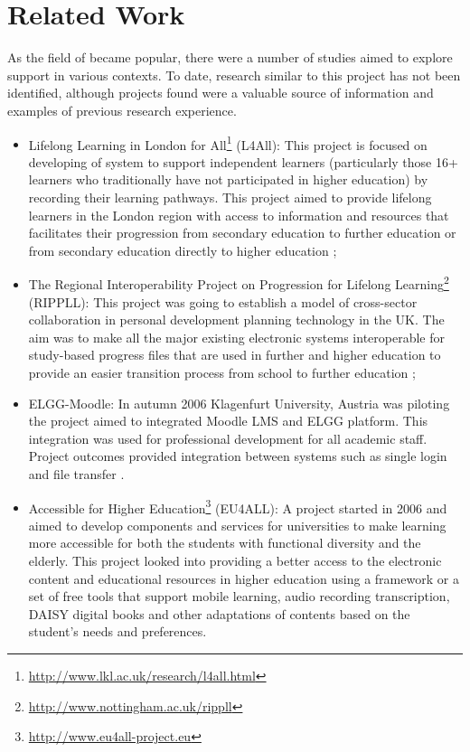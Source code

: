 \section{Related Work}
\label{sec:related}
As the field of \LLLs became popular, there were a number of studies aimed to
explore \LLLs support in various contexts. To date, research similar to this
project has not been identified, although projects found were a valuable source
of information and examples of previous research experience.

\begin{itemize}

  \item Lifelong Learning in London for
  All\footnote{\url{http://www.lkl.ac.uk/research/l4all.html}} (L4All): This
  project is focused on developing of \LLLs system to support independent
  learners (particularly those 16+ learners who traditionally have not
  participated in higher education) by recording their learning pathways. This
  project aimed to provide lifelong learners in the London region with access to
  information and resources that facilitates their progression from secondary
  education to further education or from secondary education directly to higher
  education \citep{Freitas2006};

  \item The Regional Interoperability Project on Progression for Lifelong
Learning\footnote{\url{http://www.nottingham.ac.uk/rippll}} (RIPPLL): This
project was going to establish a model of cross-sector collaboration in personal
development planning technology in the UK. The aim was to make all the major
existing electronic systems interoperable for study-based progress files that
are used in further and higher education to provide an easier transition process
from school to further education \citep{Hartnell-Young2006};

  \item ELGG-Moodle: In autumn 2006 Klagenfurt University, Austria was piloting
the project aimed to integrated Moodle LMS and ELGG platform. This integration
was used for professional development for all academic staff. Project outcomes
provided integration between systems such as single login and file transfer
\citep{Attwell2007}.

  \item Accessible \LLLc for Higher
  Education\footnote{\url{http://www.eu4all-project.eu}} (EU4ALL): A project
  started in 2006 and aimed to develop components and services for universities
  to make learning more accessible for both the students with functional
  diversity and the elderly. This project looked into providing a better access
  to the electronic content and educational resources in higher education using
  a framework or a set of free tools that support mobile learning, audio
  recording transcription, DAISY digital books and other adaptations of contents
  based on the student's needs and preferences.


\end{itemize}
